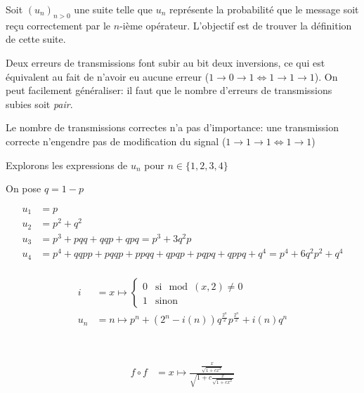 \documentclass{article}
\begin{document}
Soit $(u_n)_{n>0}$ une suite telle que $u_n$ représente la probabilité que le message
soit reçu correctement par le $n$-ième opérateur. L'objectif est de trouver la définition
de cette suite.

Deux erreurs de transmissions font subir au bit deux inversions, ce qui est équivalent 
au fait de n'avoir eu aucune erreur ($1 \to 0 \to 1 \iff 1 \to 1 \to 1$). 
On peut facilement généraliser: il faut que le nombre d'erreurs de transmissions 
subies soit \emph{pair}.

Le nombre de transmissions correctes n'a pas d'importance: une transmission correcte 
n'engendre pas de modification du signal ($1 \to 1 \to 1 \iff 1 \to 1$)

Explorons les expressions de $u_n$ pour $n \in \{1, 2, 3, 4\}$

On pose $q = 1 - p$

\begin{align*}
	u_1 &= p \\
	u_2 &= p^2 + q^2 \\
	u_3 &= p^3 + pqq + qqp + qpq = p^3 + 3q^2p \\
	u_4 &= p^4 + qqpp + pqqp + ppqq + qpqp + pqpq + qppq + q^4 = p^4 + 6q^2p^2 + q^4 \\
\end{align*}

\begin{align*}
	i &= x\mapsto \begin{cases}
		0 & \text{si} \mod(x, 2) \neq 0 \\
		1 & \text{sinon}
	\end{cases} \\
	u_n &= n \mapsto p^n + (2^n-i(n))q^{\frac{2^n}{2}}p^{\frac{2^n}{2}} + i(n)q^n \\
\end{align*}

\section{} %
\begin{align*}
	f \circ f &= x \mapsto  \frac{\frac{x}{\sqrt{1+cx^2} }}{\sqrt{1+c\frac{x}{\sqrt{1+cx^2} }} } \\
\end{align*}

\section{} %
\end{document}
